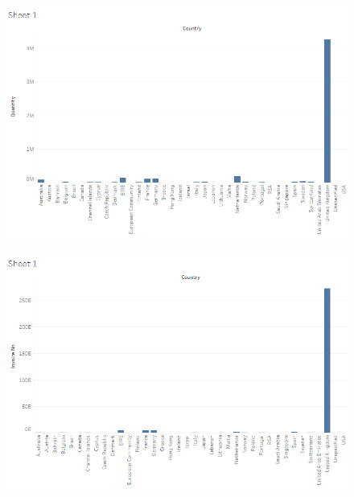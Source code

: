 \documentclass{article}
\begin{document}
\begin{figure}[h]
	\includegraphics[width=13.5cm]{da/Sheet_1.png} 
	\centering 
\end{figure} 
\begin{figure}[h]
	\includegraphics[width=13.5cm]{da/Sheet_2.png} 
	\centering 
\end{figure} 
\end{document}
